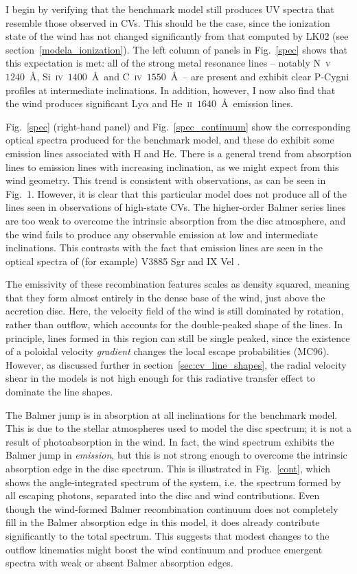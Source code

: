 I begin by verifying that the benchmark model still produces UV
spectra that resemble those observed in CVs. This should be
the case, since the ionization state of the wind has not changed
significantly from that computed by LK02 (see section~\ref{modela_ionization}). 
The left column of panels in Fig.~\ref{spec} shows that this expectation
is met: all of the strong metal resonance
lines -- notably N~\textsc{v}~$1240$~\AA,
Si~\textsc{iv}~$1400$~\AA\ and C~\textsc{iv}~$1550$~\AA\ -- 
are present and exhibit clear P-Cygni profiles
at intermediate inclinations. In addition, however, I now also find
that the wind produces significant Ly$\alpha$ and
He~\textsc{ii}~$1640$~\AA\ emission lines. 

Fig.~\ref{spec} (right-hand panel) and Fig.~\ref{spec_continuum}
show the corresponding optical spectra produced for
the benchmark model, and these do exhibit some emission lines
associated with H and He. There is 
a general trend from absorption lines to emission lines 
with increasing inclination, as we might expect from this wind
geometry. This trend is consistent with observations, as can be seen
in Fig.~1. However, it is clear that this particular model
does not produce all of the lines seen in observations of high-state CVs.
The higher-order Balmer series lines are too weak
to overcome the intrinsic absorption from the disc atmosphere, and the wind 
fails to produce any observable emission at low and intermediate inclinations.
This contrasts with the fact that emission lines are seen 
in the optical spectra of (for example) V3885 Sgr \citep{hartley2005}
and IX Vel \citep[][see also Fig.~1]{beuermann1990}.

The emissivity of these recombination 
features scales as density squared, meaning that they form almost entirely in the 
dense base of the wind, just above the accretion disc. Here, the
velocity field of the wind is still dominated by rotation, rather than
outflow, which accounts for the double-peaked shape of the lines. In
principle, lines formed in this region can still be single peaked,
since the existence of a poloidal velocity {\em gradient} changes the
local escape probabilities (MC96). However, as
discussed further in section~\ref{sec:cv_line_shapes}, the 
radial velocity shear in the
models is not high enough for this radiative transfer effect
to dominate the line shapes.

The Balmer jump is in absorption at all inclinations for the benchmark
model. This is due to the stellar atmospheres used to
model the disc spectrum; it is not a result of photoabsorption in the
wind. In fact, the wind spectrum exhibits the Balmer jump in {\em
emission}, but this is not strong enough to overcome the intrinsic
absorption edge in the disc spectrum. This is illustrated in
Fig.~\ref{cont}, which shows the angle-integrated spectrum of the system,
i.e. the spectrum formed by all escaping photons, separated into the
disc and wind contributions. Even though the wind-formed Balmer
recombination continuum does not completely fill in the Balmer
absorption edge in this model, it does already contribute
significantly to the total spectrum. This suggests that modest changes 
to the outflow kinematics might boost the wind continuum and produce
emergent spectra with weak or absent Balmer absorption edges. 

